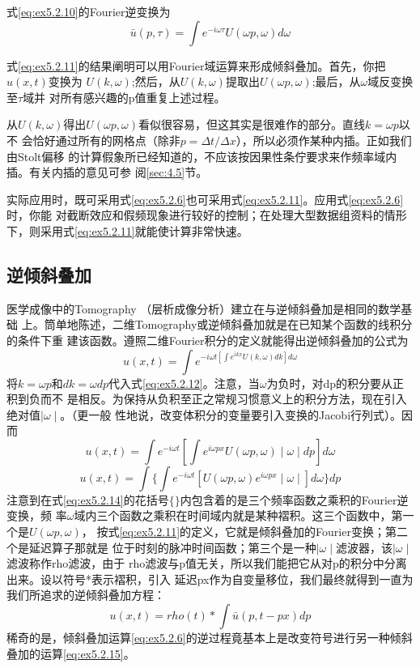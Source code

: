 式\ref{eq:ex5.2.10}的Fourier逆变换为
\begin{equation}
\bar{u}(p,\tau)=\int e^{-i\omega \tau}U(\omega p,\omega)d\omega
\label{eq:ex5.2.11}
\end{equation}

式\ref{eq:ex5.2.11}的结果阐明可以用Fourier域运算来形成倾斜叠加。首先，你把$u(x,t)$变换为
$U(k,\omega)$;然后，从$U(k,\omega)$提取出$U(\omega p,\omega)$;最后，从$\omega$域反变换至$\tau$域并
对所有感兴趣的p值重复上述过程。

从$U(k,\omega)$得出$U(\omega p,\omega)$看似很容易，但这其实是很难作的部分。直线$k=\omega p$以不
会恰好通过所有的网格点（除非$p=\Delta t/\Delta x$），所以必须作某种内插。正如我们由Stolt偏移
的计算假象所已经知道的，不应该按因果性条佇要求来作频率域内插。有关内插的意见可参
阅\ref{sec:4.5}节。

实际应用时，既可采用式\ref{eq:ex5.2.6}也可采用式\ref{eq:ex5.2.11}。应用式\ref{eq:ex5.2.6}时，你能
对截断效应和假频现象进行较好的控制；在处理大型数据组资料的情形下，则采用式\ref{eq:ex5.2.11}就能使计算非常快速。

\subsection{逆倾斜叠加}
\label{sec:5.2.7}

医学成像中的Tomography
（层析成像分析）建立在与逆倾斜叠加是相同的数学基础
上。筒单地陈述，二维Tomography或逆倾斜叠加就是在已知某个函数的线积分的条件下重
建该函数。遵照二维Fourier积分的定义就能得出逆倾斜叠加的公式为
\begin{equation}
u(x,t)=\int e^{-i\omega t[\int e^{ikx}U(k,\omega)dk]d\omega}
\label{eq:ex5.2.12}
\end{equation}
将$k=\omega p$和$dk=\omega dp$代入式\ref{eq:ex5.2.12}。注意，当$\omega$为负时，对dp的积分要从正积到负而不
是相反。为保持从负积至正之常规习惯意义上的积分方法，现在引入绝对值$\mid\omega\mid$。（更一般
性地说，改变体积分的变量要引入变换的Jacobi行列式）。因而
\begin{equation}
u(x,t)=\int e^{-i\omega t}[\int e^{i\omega px}U(\omega p,\omega)\mid\omega\mid dp]d\omega
\label{eq:ex5.2.13}
\end{equation}
\begin{equation}
u(x,t)=\int\{\int e^{-i\omega t}[U(\omega p,\omega) e^{i\omega px}\mid\omega\mid ]d\omega\}dp
\label{eq:ex5.2.14}
\end{equation}
注意到在式\ref{eq:ex5.2.14}的花括号$\{\}$内包含着的是三个频率函数之乘积的Fourier逆变换，频
率$\omega$域内三个函数之乘积在时间域内就是某种褶积。这三个函数中，第一个是$U(\omega p,\omega)$，
按式\ref{eq:ex5.2.11}的定义，它就是倾斜叠加的Fourier变换；第二个是延迟算子那就是
位于时刻的脉冲时间函数；第三个是一种$\mid \omega \mid$滤波器，该$\mid \omega \mid$滤波称作rho滤波，由于
rho滤波与p值无关，所以我们能把它从对p的积分中分离出来。设以符号*表示褶积，引入
延迟px作为自变量移位，我们最终就得到一直为我们所追求的逆倾斜叠加方程：
\begin{equation}
u(x,t)=rho(t)*\int \bar{u}(p,t-px)dp
\label{eq:ex5.2.15}
\end{equation}
稀奇的是，倾斜叠加运算\ref{eq:ex5.2.6}的逆过程竟基本上是改变符号进行另一种倾斜叠加的运算\ref{eq:ex5.2.15}。


